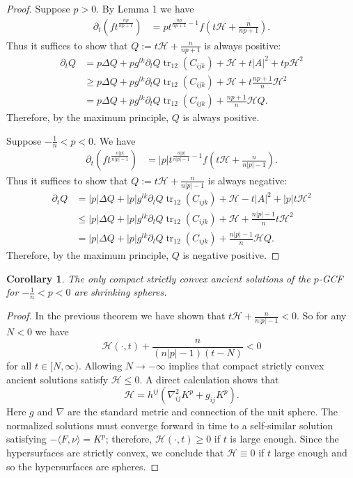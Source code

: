 \documentclass{amsart}
\newtheorem{corollary}[theorem]{Corollary}
\theoremstyle{definition}
\theoremstyle{remark}
\numberwithin{equation}{section}
\begin{document}
\begin{proof}
Suppose $p>0.$
By Lemma 1 we have
\begin{align*}
\partial_t \left(ft^{\frac{n p }{n p +1}}\right)&= p  t^{\frac{n p }{n p +1}-1}f\left(t\mathcal{H}+\frac{n}{n p +1}\right).
\end{align*}
Thus it suffices to show that $Q:=t\mathcal{H}+\frac{n}{n p +1}$ is always positive:
\begin{align*}
\partial_t Q&= p\Delta Q+ p  g^{lk}\partial_lQ \operatorname{tr}_{12}( C _{ijk})+\mathcal{H}+t| A |^2+  tp \mathcal{H}^2\\
&\geq  p \Delta Q+ p  g^{lk}\partial_lQ \operatorname{tr}_{12}( C _{ijk})+\mathcal{H}+t\frac{n p +1}{n} \mathcal{H}^2\\
&= p \Delta Q+ p  g^{lk}\partial_lQ \operatorname{tr}_{12}( C _{ijk})+\frac{n p +1}{n}\mathcal{H}Q.
\end{align*}
Therefore, by the maximum principle, $Q$ is always positive.


Suppose $-\frac{1}{n}<p<0.$ We have
\begin{align*}
\partial_t \left(ft^{\frac{n |p| }{n |p| -1}}\right)&= |p|  t^{\frac{n |p| }{n |p| -1}-1}f\left(t\mathcal{H}+\frac{n}{n |p| -1}\right).
\end{align*}
Thus it suffices to show that $Q:=t\mathcal{H}+\frac{n}{n |p| -1}$ is always negative:
\begin{align*}
\partial_t Q&= |p| \Delta Q+ |p|  g^{lk}\partial_lQ \operatorname{tr}_{12}( C _{ijk})+\mathcal{H}-t| A |^2+ |p|  t \mathcal{H}^2\\
&\leq  |p| \Delta Q+ |p|  g^{lk}\partial_lQ \operatorname{tr}_{12}( C _{ijk})+\mathcal{H}+\frac{n |p| -1}{n}t \mathcal{H}^2\\
&= |p| \Delta Q+ |p|  g^{lk}\partial_lQ \operatorname{tr}_{12}( C _{ijk})+\frac{n |p| -1}{n}\mathcal{H}Q.
\end{align*}
Therefore, by the maximum principle, $Q$ is negative positive.
\end{proof}
\begin{corollary}
The only compact strictly convex ancient solutions of the $p$-GCF for $-\frac{1}{n}<p<0$ are shrinking spheres.
\end{corollary}
\begin{proof}
In the previous theorem we have shown
that $t\mathcal{H}+\frac{n}{n |p| -1}<0$. So for any $N<0$ we have
\[\mathcal{H}(\cdot,t)+\frac{n}{(n |p| -1)(t-N)}<0\]
for all $t\in [N,\infty).$
Allowing $N\to -\infty$ implies that compact strictly convex ancient solutions satisfy $\mathcal{H}\leq 0.$ A direct calculation shows that
\[\mathcal{H}=h^{ij}(\nabla_{ij}^2K^p+g_{ij}K^{p}).\]
Here $g$ and $\nabla$ are the standard metric and connection of the unit sphere. The normalized solutions must converge forward in time to a self-similar solution satisfying $-\langle F,\nu \rangle=K^{p}$; therefore, $\mathcal{H}(\cdot,t)\geq 0$ if $t$ is large enough. Since the hypersurfaces are strictly convex, we conclude that  $\mathcal{H}\equiv 0$ if $t$ large enough and so the hypersurfaces are spheres.
\end{proof}
\end{document}
